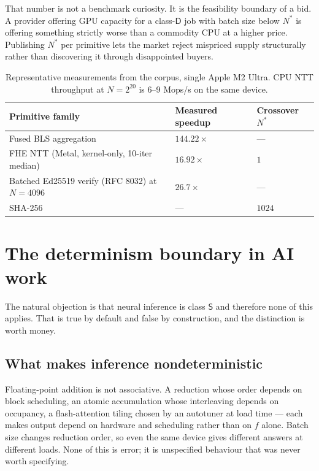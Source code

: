 \documentclass[11pt,a4paper]{article}
\begin{document}
That number is not a benchmark curiosity. It is the feasibility boundary of a
bid. A provider offering GPU capacity for a class-$\mathsf{D}$ job with batch
size below $N^{*}$ is offering something strictly worse than a commodity CPU at
a higher price. Publishing $N^{*}$ per primitive lets the market reject
mispriced supply structurally rather than discovering it through disappointed
buyers.

\begin{table}[h]
\centering
\begin{tabular}{lll}
\toprule
Primitive family & Measured speedup & Crossover $N^{*}$ \\
\midrule
Fused BLS aggregation      & $144.22\times$ & --- \\
FHE NTT (Metal, kernel-only, 10-iter median) & $16.92\times$ & $1$ \\
Batched Ed25519 verify (RFC 8032) at $N{=}4096$ & $26.7\times$ & --- \\
SHA-256                     & ---            & $1024$ \\
\bottomrule
\end{tabular}
\caption{Representative measurements from the corpus, single Apple M2 Ultra.
CPU NTT throughput at $N{=}2^{20}$ is 6--9 Mops/s on the same device.}
\end{table}

\section{The determinism boundary in AI work}

The natural objection is that neural inference is class $\mathsf{S}$ and
therefore none of this applies. That is true by default and false by
construction, and the distinction is worth money.

\subsection{What makes inference nondeterministic}

Floating-point addition is not associative. A reduction whose order depends on
block scheduling, an atomic accumulation whose interleaving depends on
occupancy, a flash-attention tiling chosen by an autotuner at load time --- each
makes output depend on hardware and scheduling rather than on $f$ alone. Batch
size changes reduction order, so even the same device gives different answers at
different loads. None of this is error; it is unspecified behaviour that was
never worth specifying.
\end{document}
